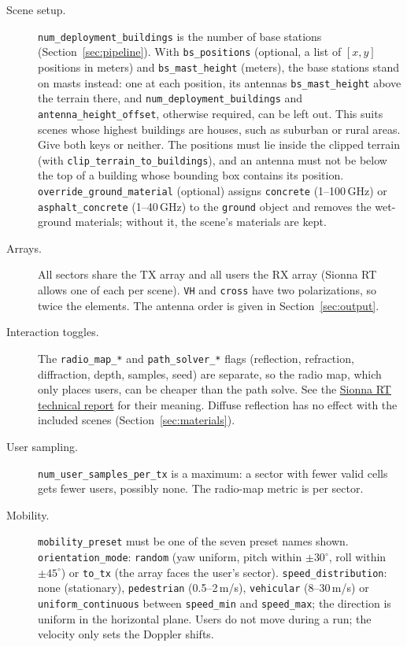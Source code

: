 \documentclass{article}
\newcommand{\key}[1]{\texttt{#1}}
\begin{document}
\begin{description}
  \item[Scene setup.] \key{num\_deployment\_buildings} is the number of base stations (Section~\ref{sec:pipeline}). With \key{bs\_positions} (optional, a list of $[x, y]$ positions in meters) and \key{bs\_mast\_height} (meters), the base stations stand on masts instead: one at each position, its antennas \key{bs\_mast\_height} above the terrain there, and \key{num\_deployment\_buildings} and \key{antenna\_height\_offset}, otherwise required, can be left out. This suits scenes whose highest buildings are houses, such as suburban or rural areas. Give both keys or neither. The positions must lie inside the clipped terrain (with \key{clip\_terrain\_to\_buildings}), and an antenna must not be below the top of a building whose bounding box contains its position. \key{override\_ground\_material} (optional) assigns \texttt{concrete} (1--100\,GHz) or \texttt{asphalt\_concrete} (1--40\,GHz) to the \texttt{ground} object and removes the wet-ground materials; without it, the scene's materials are kept.
  \item[Arrays.] All sectors share the TX array and all users the RX array (Sionna RT allows one of each per scene). \texttt{VH} and \texttt{cross} have two polarizations, so twice the elements. The antenna order is given in Section~\ref{sec:output}.
  \item[Interaction toggles.] The \texttt{radio\_map\_*} and \texttt{path\_solver\_*} flags (reflection, refraction, diffraction, depth, samples, seed) are separate, so the radio map, which only places users, can be cheaper than the path solve. See the \href{https://arxiv.org/abs/2504.21719}{Sionna RT technical report} for their meaning. Diffuse reflection has no effect with the included scenes (Section~\ref{sec:materials}).
  \item[User sampling.] \key{num\_user\_samples\_per\_tx} is a maximum: a sector with fewer valid cells gets fewer users, possibly none. The radio-map metric is per sector.
  \item[Mobility.] \key{mobility\_preset} must be one of the seven preset names shown. \texttt{orientation\_mode}: \texttt{random} (yaw uniform, pitch within $\pm 30^\circ$, roll within $\pm 45^\circ$) or \texttt{to\_tx} (the array faces the user's sector). \texttt{speed\_distribution}: none (stationary), \texttt{pedestrian} (0.5--2\,m/s), \texttt{vehicular} (8--30\,m/s) or \texttt{uniform\_continuous} between \texttt{speed\_min} and \texttt{speed\_max}; the direction is uniform in the horizontal plane. Users do not move during a run; the velocity only sets the Doppler shifts.

\end{description}
\end{document}

